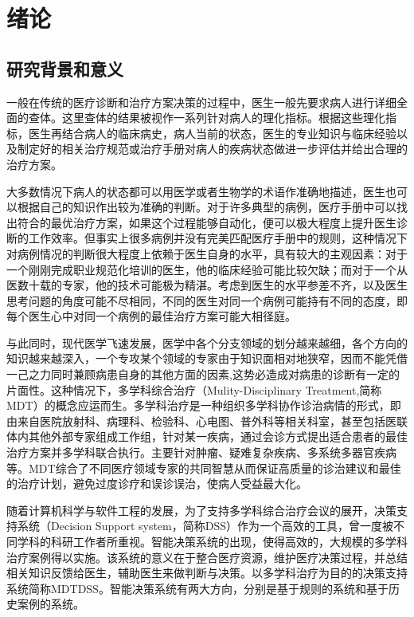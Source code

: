 
\chapter{绪论}

\section{研究背景和意义}
一般在传统的医疗诊断和治疗方案决策的过程中，医生一般先要求病人进行详细全面的查体。这里查体的结果被视作一系列针对病人的理化指标。根据这些理化指标，医生再结合病人的临床病史，病人当前的状态，医生的专业知识与临床经验以及制定好的相关治疗规范或治疗手册对病人的疾病状态做进一步评估并给出合理的治疗方案。

大多数情况下病人的状态都可以用医学或者生物学的术语作准确地描述，医生也可以根据自己的知识作出较为准确的判断。对于许多典型的病例，医疗手册中可以找出符合的最优治疗方案，如果这个过程能够自动化，便可以极大程度上提升医生诊断的工作效率。但事实上很多病例并没有完美匹配医疗手册中的规则，这种情况下对病例情况的判断很大程度上依赖于医生自身的水平，具有较大的主观因素：对于一个刚刚完成职业规范化培训的医生，他的临床经验可能比较欠缺；而对于一个从医数十载的专家，他的技术可能极为精湛。考虑到医生的水平参差不齐，以及医生思考问题的角度可能不尽相同，不同的医生对同一个病例可能持有不同的态度，即每个医生心中对同一个病例的最佳治疗方案可能大相径庭。

与此同时，现代医学飞速发展，医学中各个分支领域的划分越来越细，各个方向的知识越来越深入，一个专攻某个领域的专家由于知识面相对地狭窄，因而不能凭借一己之力同时兼顾病患自身的其他方面的因素,这势必造成对病患的诊断有一定的片面性。这种情况下，多学科综合治疗（Mulity-Disciplinary Treatment,简称MDT）的概念\cite{Taylorc951}应运而生。多学科治疗是一种组织多学科协作诊治病情的形式，即由来自医院放射科、病理科、检验科、心电图、普外科等相关科室，甚至包括医联体内其他外部专家组成工作组，针对某一疾病，通过会诊方式提出适合患者的最佳治疗方案并多学科联合执行。主要针对肿瘤、疑难复杂疾病、多系统多器官疾病等。MDT综合了不同医疗领域专家的共同智慧从而保证高质量的诊治建议和最佳的治疗计划，避免过度诊疗和误诊误治，使病人受益最大化。

随着计算机科学与软件工程的发展，为了支持多学科综合治疗会议的展开，决策支持系统（Decision Support system，简称DSS）作为一个高效的工具，曾一度被不同学科的科研工作者所重视\cite{Filip2017}。智能决策系统的出现，使得高效的，大规模的多学科治疗案例得以实施。该系统的意义在于整合医疗资源，维护医疗决策过程，并总结相关知识反馈给医生，辅助医生来做判断与决策。以多学科治疗为目的的决策支持系统简称MDTDSS。智能决策系统有两大方向，分别是基于规则的系统和基于历史案例的系统。

